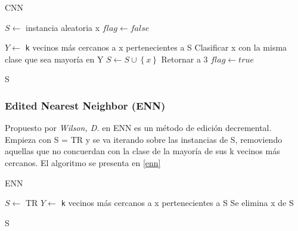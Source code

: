 \begin{algorithm}
\caption{CNN}
\label{cnn}
\begin{algorithmic}[1]


\State $S \gets$ instancia aleatoria x
\State $flag \gets false$

    \State $Y \gets$ \texttt{k} vecinos más cercanos a x pertenecientes a S 
    \State Clasificar x con la misma clase que sea mayoría en Y
      \State $S \gets S \cup \left\{x\right\}$
      \State Retornar a 3 
    \EndIf
  \EndFor
    \State $flag \gets true$
  \EndIf
\EndWhile

\State \Return S

\end{algorithmic}
\end{algorithm}


\subsubsection{Edited Nearest Neighbor (ENN)}

Propuesto por  \emph{Wilson, D.} en \cite{wilson1972asymptotic} ENN es un método de edición decremental. Empieza con S = TR y se va iterando sobre las instancias de S, removiendo aquellas que no concuerdan con la clase de la mayoría de sus k vecinos más cercanos. El algoritmo se presenta en \ref{enn}

\begin{algorithm}
\caption{ENN}
\label{enn}
\begin{algorithmic}[1]


\State $S \gets$ TR
  \State $Y \gets$ \texttt{k} vecinos más cercanos a x pertenecientes a S
    \State Se elimina x de S
  \EndIf
\EndFor

\State \Return S

\end{algorithmic}
\end{algorithm}


